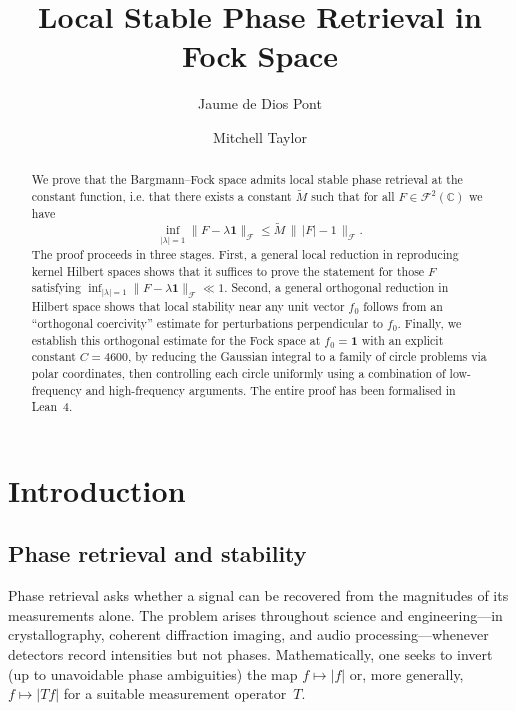 \documentclass[11pt]{amsart}
\title{Local Stable Phase Retrieval in Fock Space}
\author{Jaume de Dios Pont}
\author{Mitchell Taylor}
\theoremstyle{definition}
\theoremstyle{remark}
\newcommand{\C}{\mathbb{C}}
\newcommand{\abs}[1]{\lvert #1 \rvert}
\newcommand{\norm}[1]{\lVert #1 \rVert}
\newcommand{\cF}{\mathcal{F}}
\begin{document}
\begin{abstract}
We prove that the Bargmann--Fock space admits local stable phase retrieval at
the constant function, i.e. that there exists a constant \(\widetilde M\)
such that for all \(F\in \cF^2(\C)\) we have
\[
\inf_{\abs{\lambda}=1}\norm{F-\lambda\mathbf 1}_{\cF}
\le
\widetilde M\,\bigl\|\,\abs F-1\,\bigr\|_{\cF}.
\]
The proof proceeds in three stages. First, a general local reduction in
reproducing kernel Hilbert spaces shows that it suffices to prove the
statement for those \(F\) satisfying
\(\inf_{\abs{\lambda}=1}\norm{F-\lambda\mathbf 1}_{\cF}\ll1\). Second, a
general orthogonal reduction in Hilbert space shows that local stability near
any unit vector \(f_0\) follows from an ``orthogonal coercivity'' estimate for
perturbations perpendicular to \(f_0\). Finally, we establish this orthogonal
estimate for the Fock space at \(f_0=\mathbf 1\) with an explicit constant
\(C=4600\), by reducing the Gaussian integral to a family of circle problems
via polar coordinates, then controlling each circle uniformly using a
combination of low-frequency and high-frequency arguments. The entire proof
has been formalised in Lean~4.
\end{abstract}
\maketitle

\section{Introduction}\label{sec:intro}

\subsection{Phase retrieval and stability}

Phase retrieval asks whether a signal can be recovered from the magnitudes of
its measurements alone.  The problem arises throughout science and
engineering---in crystallography, coherent diffraction imaging, and audio
processing---whenever detectors record intensities but not phases.
Mathematically, one seeks to invert (up to unavoidable phase ambiguities) the
map $f \mapsto \abs{f}$ or, more generally, $f \mapsto \abs{Tf}$ for a
suitable measurement operator~$T$.
\end{document}
